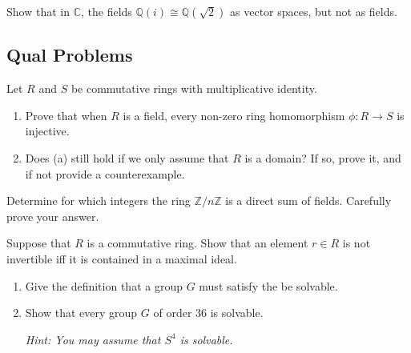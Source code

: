 \begin{problem}[Hungerford 5.1.16]
Show that in $\mathbb{C}$, the fields $\mathbb{Q}(i) \cong \mathbb{Q}(\sqrt 2)$ as vector spaces, but not as fields.
\label{prob:3.7}
\end{problem}

\newpage
\subsection{Qual Problems}

\begin{problem}
Let $R$ and $S$ be commutative rings with multiplicative identity.

\begin{enumerate}
    \item Prove that when $R$ is a field, every non-zero ring homomorphism $\phi: R\to S$ is injective.
    \item Does (a) still hold if we only assume that $R$ is a domain? If so, prove it, and if not provide a counterexample.
\end{enumerate}
\end{problem}

\begin{problem}
Determine for which integers the ring $\mathbb{Z}/n\mathbb{Z}$ is a direct sum of fields. Carefully prove your answer.
\end{problem}

\begin{problem}
Suppose that $R$ is a commutative ring. Show that an element $r\in R$ is not invertible iff it is contained in a maximal ideal.
\end{problem}

\begin{problem}\hfill

\begin{enumerate}
    \item Give the definition that a group $G$ must satisfy the be solvable.
    \item Show that every group $G$ of order 36 is solvable.
    
    \textit{Hint: You may assume that $S^4$ is solvable.}
\end{enumerate}
\end{problem}
